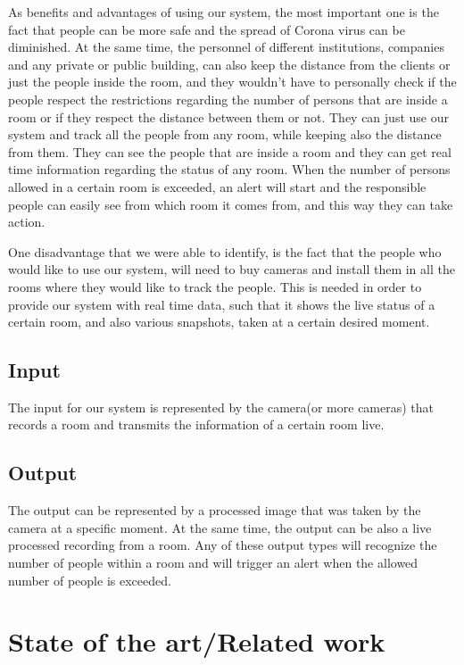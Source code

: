 \documentclass[runningheads,a4paper,11pt]{report}
\begin{document}
As benefits and advantages of using our system, the most important one is the fact that people can be more safe and the spread of Corona virus can be diminished. At the same time, the personnel of different institutions, companies and any private or public building, can also keep the distance from the clients or just the people inside the room, and they wouldn't have to personally check if the people respect the restrictions regarding the number of persons that are inside a room or if they respect the distance between them or not.
They can just use our system and track all the people from any room, while keeping also the distance from them. They can see the people that are inside a room and they can get real time information regarding the status of any room. When the number of persons allowed in a certain room is exceeded, an alert will start and the responsible people can easily see from which room it comes from, and this way they can take action.

One disadvantage that we were able to identify, is the fact that the people who would like to use our system, will need to buy cameras and install them in all the rooms where they would like to track the people. This is needed in order to provide our system with real time data, such that it shows the live status of a certain room, and also various snapshots, taken at a certain desired moment.

\section{Input}
\label{section:input}

The input for our system is represented by the camera(or more cameras) that records a room and transmits the information of a certain room live.

\section{Output}
\label{section:output}

The output can be represented by a processed image that was taken by the camera at a specific moment. At the same time, the output can be also a live processed recording from a room.
Any of these output types will recognize the number of people within a room and will trigger an alert when the allowed number of people is exceeded.

\chapter{State of the art/Related work}
\label{chapter:stateOfArt}
\end{document}
